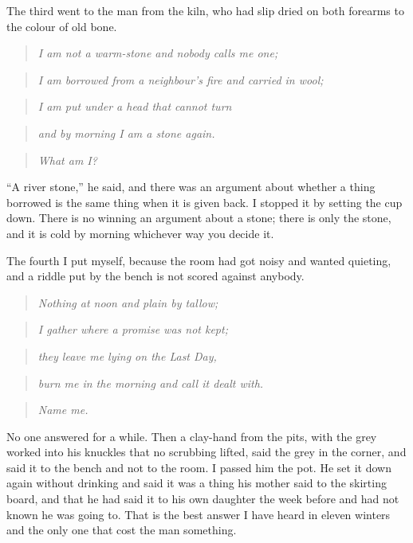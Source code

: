 \documentclass{design/chronicle}
\begin{document}
The third went to the man from the kiln, who had slip dried on both forearms to the colour of old bone.

\begin{quote}\itshape I am not a warm-stone and nobody calls me one;\end{quote}

\begin{quote}\itshape I am borrowed from a neighbour’s fire and carried in wool;\end{quote}

\begin{quote}\itshape I am put under a head that cannot turn\end{quote}

\begin{quote}\itshape and by morning I am a stone again.\end{quote}

\begin{quote}\itshape What am I?\end{quote}

“A river stone,” he said, and there was an argument about whether a thing borrowed is the same thing when it is given back. I stopped it by setting the cup down. There is no winning an argument about a stone; there is only the stone, and it is cold by morning whichever way you decide it.

The fourth I put myself, because the room had got noisy and wanted quieting, and a riddle put by the bench is not scored against anybody.

\begin{quote}\itshape Nothing at noon and plain by tallow;\end{quote}

\begin{quote}\itshape I gather where a promise was not kept;\end{quote}

\begin{quote}\itshape they leave me lying on the Last Day,\end{quote}

\begin{quote}\itshape burn me in the morning and call it dealt with.\end{quote}

\begin{quote}\itshape Name me.\end{quote}

No one answered for a while. Then a clay-hand from the pits, with the grey worked into his knuckles that no scrubbing lifted, said the grey in the corner, and said it to the bench and not to the room. I passed him the pot. He set it down again without drinking and said it was a thing his mother said to the skirting board, and that he had said it to his own daughter the week before and had not known he was going to. That is the best answer I have heard in eleven winters and the only one that cost the man something.
\end{document}
